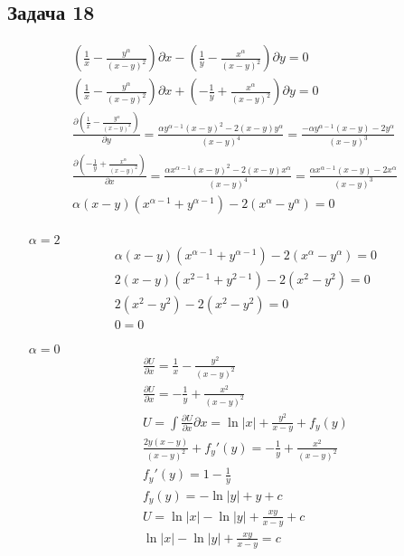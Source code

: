 \subsection*{Задача 18}
\begin{gather*}
	\left(\frac{1}{x} - \frac{y^{\alpha}}{(x-y)^2}\right) \partial x - \left(\frac{1}{y} - \frac{x^\alpha}{(x-y)^2}\right) \partial y = 0\\
	\left(\frac{1}{x} - \frac{y^{\alpha}}{(x-y)^2}\right) \partial x + \left(-\frac{1}{y} + \frac{x^\alpha}{(x-y)^2}\right) \partial y = 0\\
	\frac{\partial \left(\frac{1}{x} - \frac{y^{\alpha}}{(x-y)^2}\right)}{\partial y} = \frac{\alpha y^{\alpha - 1}(x-y)^2 - 2(x-y)y^{\alpha}}{(x-y)^4} = \frac{-\alpha y^{\alpha - 1}(x-y) - 2y^{\alpha}}{(x-y)^3}\\
	\frac{\partial \left(-\frac{1}{y} + \frac{x^\alpha}{(x-y)^2}\right)}{\partial x} = \frac{\alpha x^{\alpha-1}(x-y)^2 - 2(x-y)x^{\alpha}}{(x-y)^4} = \frac{\alpha x^{\alpha-1}(x-y) - 2x^{\alpha}}{(x-y)^3}\\
	\alpha(x-y)(x^{\alpha - 1} + y^{\alpha - 1}) - 2(x^{\alpha} - y^{\alpha}) = 0\\
\end{gather*}
\begin{enumerate}
\item[$\alpha = 2$]
	\begin{gather*}
		\alpha(x-y)(x^{\alpha - 1} + y^{\alpha - 1}) - 2(x^{\alpha} - y^{\alpha}) = 0\\
		2(x-y)(x^{2 - 1} + y^{2 - 1}) - 2(x^{2} - y^{2}) = 0\\
		2(x^{2} - y^{2}) - 2(x^{2} - y^{2}) = 0\\
		0 = 0
	\end{gather*}
\item[$\alpha = 0$]
	\begin{gather*}
		\frac{\partial U}{\partial x} = \frac{1}{x} - \frac{y^2}{(x-y)^2}\\
		\frac{\partial U}{\partial x} = -\frac{1}{y} + \frac{x^2}{(x-y)^2}\\
		U = \int \frac{\partial U}{\partial x} \partial x = \ln|x| + \frac{y^2}{x-y} + f_y(y)\\
		\frac{2y(x-y)}{(x-y)^2} + f_y'(y) = -\frac{1}{y} + \frac{x^2}{(x-y)^2}\\
		f_y'(y) = 1 - \frac{1}{y}\\
		f_y(y) = -\ln|y| + y + c\\
		U = \ln|x| - \ln|y| + \frac{xy}{x-y} + c\\
		\ln|x| - \ln|y| + \frac{xy}{x-y} = c
	\end{gather*}
\end{enumerate}


